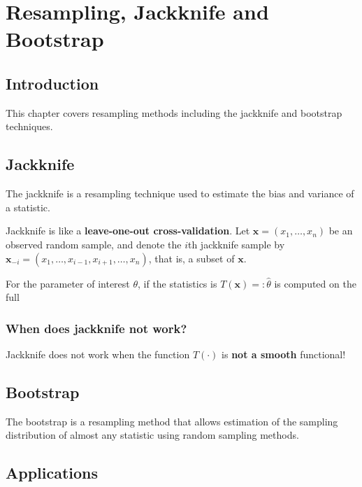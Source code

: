 \documentclass[
  letterpaper,
  DIV=11,
  numbers=noendperiod]{scrreprt}
\begin{document}

\chapter{Resampling, Jackknife and
Bootstrap}\label{resampling-jackknife-and-bootstrap}

\section{Introduction}\label{introduction}

This chapter covers resampling methods including the jackknife and
bootstrap techniques.

\section{Jackknife}\label{jackknife}

The jackknife is a resampling technique used to estimate the bias and
variance of a statistic.

Jackknife is like a \textbf{leave-one-out cross-validation}. Let
\(\mathbf{x}= (x_1,\dots,x_n)\) be an observed random sample, and denote
the \(i\)th jackknife sample by
\(\mathbf{x}_{-i} = (x_1,\dots,x_{i-1},x_{i+1},\dots,x_n)\), that is, a
subset of \(\mathbf{x}\).

For the parameter of interest \(\theta\), if the statistics is
\(T(\mathbf{x})=:\hat{\theta}\) is computed on the full

\subsection{When does jackknife not
work?}\label{when-does-jackknife-not-work}

Jackknife does not work when the function \(T(\cdot)\) is \textbf{not a
smooth} functional!

\section{Bootstrap}\label{bootstrap}

The bootstrap is a resampling method that allows estimation of the
sampling distribution of almost any statistic using random sampling
methods.

\section{Applications}\label{applications}
\end{document}
